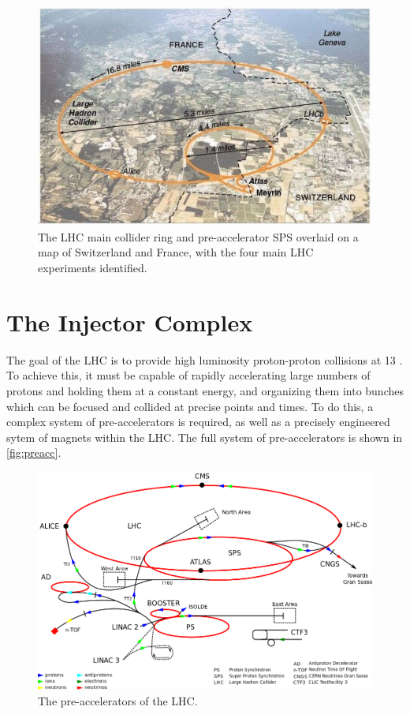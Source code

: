 \begin{centering}
\begin{figure}[!hbt]
\myfloatalign
\includegraphics[width=.90\linewidth]{figures/lhc/lhc-5-640x420.jpg}
\caption{The \ac{LHC} main collider ring and pre-accelerator \ac{SPS} overlaid on a map of Switzerland and France, with the four main \ac{LHC} experiments identified.}
\label{fig:lhc_map}
\end{figure}
\end{centering}


\section{The Injector Complex}

The goal of the \ac{LHC} is to provide high luminosity proton-proton collisions at 13 \tev. To achieve this, it must be capable of rapidly accelerating large numbers of protons and holding them at a constant energy, and organizing them into bunches which can be focused and collided at precise points and times. To do this, a complex system of pre-accelerators is required, as well as a precisely engineered sytem of magnets within the \ac{LHC}. The full system of pre-accelerators is shown in \autoref{fig:preacc}.

\begin{centering}
\begin{figure}[!hbt]
\myfloatalign
\includegraphics[width=.90\linewidth]{figures/lhc/Cern-accelerator-complex.png}
\caption{The pre-accelerators of the \ac{LHC}.}
\label{fig:preacc}
\end{figure}
\end{centering}

